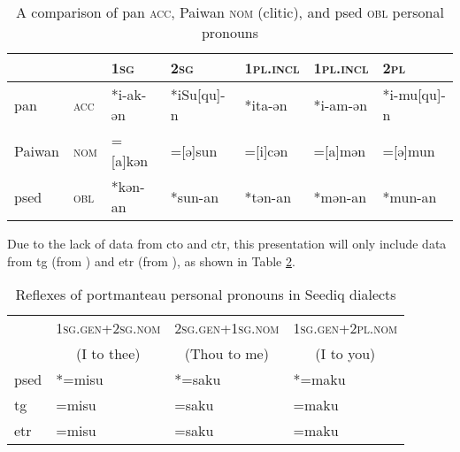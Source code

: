 \begin{table}[!htbp]
\centering
\caption{A comparison of \acs{pan} \textsc{acc}, Paiwan \textsc{nom} (clitic), and \acl{psed} \textsc{obl} personal pronouns}
\label{tab:panacc}
\begin{tabular}{lllllll}
\hline
       &     & \textsc{1sg}      & \textsc{2sg}        & \textsc{1pl.incl} & \textsc{1pl.incl} & \textsc{2pl}         \\\hline
\acs{pan}   & \textsc{acc} & *i-ak-ən & *iSu[qu]-n & *ita-ən  & *i-am-ən & *i-mu[qu]-n \\
Paiwan & \textsc{nom} & =[a]kən  & =[ə]sun    & =[i]cən  & =[a]mən  & =[ə]mun     \\
\acl{psed} & \textsc{obl} & *kən-an  & *sun-an    & *tən-an  & *mən-an  & *mun-an    \\ \hline
\end{tabular}
\end{table}


Due to the lack of data from \acl{cto} and \acl{ctr}, this presentation will only include data from \acl{tg} (from \cite[62]{Sung2018Sedgrammar}) and \acl{etr} (from \cite[74]{Lee2018Trugrammar}), as shown in Table \ref{tab:porref}.

\begin{table}[!htbp]
\centering
\caption{Reflexes of portmanteau personal pronouns in Seediq dialects}
\label{tab:porref}
\begin{tabular}{llll}
\hline
                     & \textsc{1sg.gen+2sg.nom}                 & \textsc{2sg.gen+1sg.nom}                  & \textsc{1sg.gen+2pl.nom}                \\ 
\multicolumn{1}{c}{} & \multicolumn{1}{c}{(I to thee)} & \multicolumn{1}{c}{(Thou to me)} & \multicolumn{1}{c}{(I to you)} \\ \hline
\acl{psed}               & *=misu                          & *=saku                           & *=maku                         \\
\acs{tg}                 & =misu                           & =saku                            & =maku                          \\
\acs{etr}                & =misu                           & =saku                            & =maku          \\ \hline                
\end{tabular}
\end{table}

